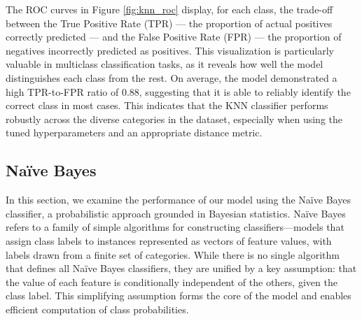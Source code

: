 \documentclass[10pt]{article}
\begin{document}
The ROC curves in Figure \ref{fig:knn_roc} display, for each class, the trade-off between the True Positive Rate (TPR) — the proportion of actual positives correctly predicted — and the False Positive Rate (FPR) — the proportion of negatives incorrectly predicted as positives. This visualization is particularly valuable in multiclass classification tasks, as it reveals how well the model distinguishes each class from the rest.\newline
On average, the model demonstrated a high TPR-to-FPR ratio of 0.88, suggesting that it is able to reliably identify the correct class in most cases. This indicates that the KNN classifier performs robustly across the diverse categories in the dataset, especially when using the tuned hyperparameters and an appropriate distance metric.

\subsection{Naïve Bayes}
In this section, we examine the performance of our model using the Naïve Bayes classifier, a probabilistic approach grounded in Bayesian statistics. Naïve Bayes refers to a family of simple algorithms for constructing classifiers—models that assign class labels to instances represented as vectors of feature values, with labels drawn from a finite set of categories. \newline
While there is no single algorithm that defines all Naïve Bayes classifiers, they are unified by a key assumption: that the value of each feature is conditionally independent of the others, given the class label. This simplifying assumption forms the core of the model and enables efficient computation of class probabilities.
\end{document}
